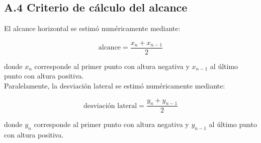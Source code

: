 \documentclass[11pt,a4paper]{article}
\begin{document}
\subsection*{A.4 Criterio de cálculo del alcance}

El alcance horizontal se estimó numéricamente mediante:

\[
\text{alcance} = \frac{x_{n}+x_{n-1}}{2}
\]

donde $x_n$ corresponde al primer punto con altura negativa y $x_{n-1}$ al último punto con altura positiva.\\
Paralelamente, la desviación lateral se estimó numéricamente mediante:

\[
\text{desviación lateral} = \frac{y_{n}+y_{n-1}}{2}
\]

donde $y_n$ corresponde al primer punto con altura negativa y $y_{n-1}$ al último punto con altura positiva.
\end{document}
